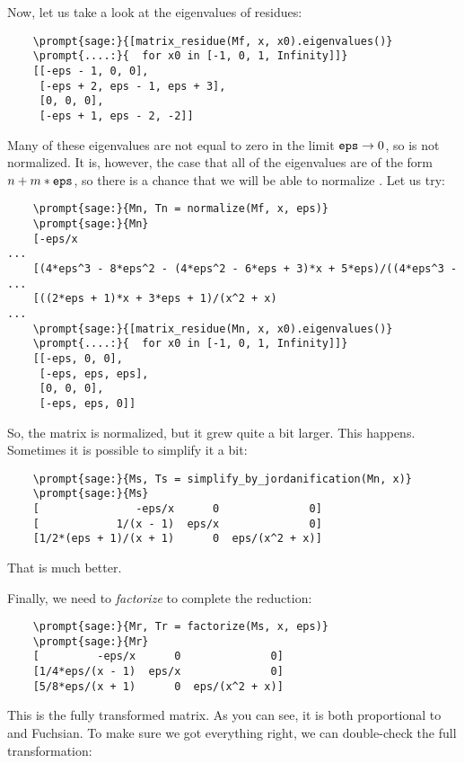 \documentclass[12pt,a4paper]{article}
\begin{document}
Now, let us take a look at the eigenvalues of  residues:

\begin{Verbatim}
    \prompt{sage:}{[matrix_residue(Mf, x, x0).eigenvalues()}
    \prompt{....:}{  for x0 in [-1, 0, 1, Infinity]]}
    [[-eps - 1, 0, 0],
     [-eps + 2, eps - 1, eps + 3],
     [0, 0, 0],
     [-eps + 1, eps - 2, -2]]
\end{Verbatim}

Many of these eigenvalues are not equal to zero in the limit $\texttt{eps}\to0$, so  is not normalized.
It is, however, the case that all of the eigenvalues are of the form $n + m*\texttt{eps}$, so there is a chance that we will be able to normalize .
Let us try:

\begin{Verbatim}
    \prompt{sage:}{Mn, Tn = normalize(Mf, x, eps)}
    \prompt{sage:}{Mn}
    [-eps/x                                                            ...
    [(4*eps^3 - 8*eps^2 - (4*eps^2 - 6*eps + 3)*x + 5*eps)/((4*eps^3 - ...
    [((2*eps + 1)*x + 3*eps + 1)/(x^2 + x)                             ...
    \prompt{sage:}{[matrix_residue(Mn, x, x0).eigenvalues()}
    \prompt{....:}{  for x0 in [-1, 0, 1, Infinity]]}
    [[-eps, 0, 0],
     [-eps, eps, eps],
     [0, 0, 0],
     [-eps, eps, 0]]
\end{Verbatim}

So, the matrix is normalized, but it grew quite a bit larger.
This happens.
Sometimes it is possible to simplify it a bit:

\begin{Verbatim}
    \prompt{sage:}{Ms, Ts = simplify_by_jordanification(Mn, x)}
    \prompt{sage:}{Ms}
    [               -eps/x      0              0]
    [            1/(x - 1)  eps/x              0]
    [1/2*(eps + 1)/(x + 1)      0  eps/(x^2 + x)]
\end{Verbatim}

That is much better.

Finally, we need to \textit{factorize}  to complete the reduction:

\begin{Verbatim}
    \prompt{sage:}{Mr, Tr = factorize(Ms, x, eps)}
    \prompt{sage:}{Mr}
    [         -eps/x      0              0]
    [1/4*eps/(x - 1)  eps/x              0]
    [5/8*eps/(x + 1)      0  eps/(x^2 + x)]
\end{Verbatim}

This is the fully transformed matrix.
As you can see, it is both proportional to  and Fuchsian.
To make sure we got everything right, we can double-check the full transformation:
\end{document}
